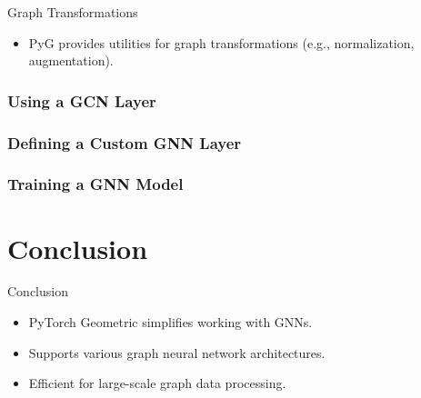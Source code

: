 \documentclass{beamer}
\begin{document}
\begin{frame}{Graph Transformations}
    \begin{itemize}
        \item PyG provides utilities for graph transformations (e.g., normalization, augmentation).
    \end{itemize}

\end{frame}

\begin{frame}
\frametitle{Using a GCN Layer}

\end{frame}

\begin{frame}
\frametitle{Defining a Custom GNN Layer}

\end{frame}

\begin{frame}
\frametitle{Training a GNN Model}

\end{frame}

\section{Conclusion}
\begin{frame}{Conclusion}
    \begin{itemize}
        \item PyTorch Geometric simplifies working with GNNs.
        \item Supports various graph neural network architectures.
        \item Efficient for large-scale graph data processing.
    \end{itemize}
\end{frame}
\end{document}
